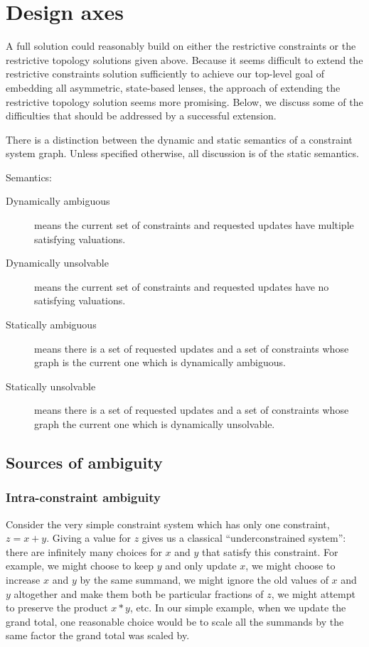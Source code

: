 \section{Design axes}

A full solution could reasonably build on either the restrictive constraints
or the restrictive topology solutions given above. Because it seems
difficult to extend the restrictive constraints solution sufficiently to
achieve our top-level goal of embedding all asymmetric, state-based lenses,
the approach of extending the restrictive topology solution seems more
promising. Below, we discuss some of the difficulties that should be addressed
by a successful extension.

There is a distinction between the dynamic and static semantics of a
constraint system graph. Unless specified otherwise, all discussion is of
the static semantics.
\begin{definition} Semantics:
    \begin{description}
        \item[Dynamically ambiguous] means the current set of constraints and
            requested updates have multiple satisfying valuations.
        \item[Dynamically unsolvable] means the current set of constraints and
            requested updates have no satisfying valuations.
        \item[Statically ambiguous] means there is a set of requested updates
            and a set of constraints whose graph is the current one which is
            dynamically ambiguous.
        \item[Statically unsolvable] means there is a set of requested updates
            and a set of constraints whose graph the current one which is
            dynamically unsolvable.
    \end{description}
\end{definition}

\subsection{Sources of ambiguity}
\subsubsection{Intra-constraint ambiguity}
Consider the very simple constraint system which has only one constraint, $z
= x+y$. Giving a value for $z$ gives us a classical ``underconstrained
system'': there are infinitely many choices for $x$ and $y$ that satisfy
this constraint. For example, we might choose to keep $y$ and only update
$x$, we might choose to increase $x$ and $y$ by the same summand, we might
ignore the old values of $x$ and $y$ altogether and make them both be
particular fractions of $z$, we might attempt to preserve the product $x*y$,
etc. In our simple example, when we update the grand total, one reasonable
choice would be to scale all the summands by the same factor the grand total
was scaled by.

